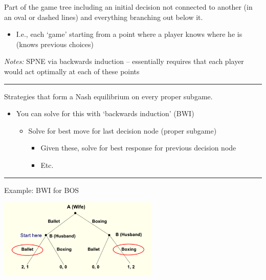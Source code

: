 \documentclass[]{article}
\providecommand{\tightlist}{%
  \setlength{\itemsep}{0pt}\setlength{\parskip}{0pt}}
\begin{document}
\begin{description}
\tightlist
\item[Proper subgame]
Part of the game tree including an initial decision not connected to
another (in an oval or dashed lines) and everything branching out below
it.
\end{description}

\begin{itemize}
\tightlist
\item
  I.e., each `game' starting from a point where a player knows where he
  is (knows previous choices)
\end{itemize}

\emph{Notes:} SPNE via backwards induction -- essentially requires that
each player would act optimally at each of these points

\begin{center}\rule{0.5\linewidth}{\linethickness}\end{center}

\begin{description}
\tightlist
\item[Subgame-Perfect Nash Equilibrium (SPNE)]
Strategies that form a Nash equilibrium on every proper subgame.
\end{description}

\begin{itemize}
\tightlist
\item
  You can solve for this with `backwards induction' (BWI)

  \begin{itemize}
  \tightlist
  \item
    Solve for best move for last decision node (proper subgame)

    \begin{itemize}
    \tightlist
    \item
      Given these, solve for best response for previous decision node
    \item
      Etc.
    \end{itemize}
  \end{itemize}
\end{itemize}

\begin{center}\rule{0.5\linewidth}{\linethickness}\end{center}

Example: BWI for BOS

\includegraphics[height=1.5in]{picsfigs/bosbwi1.png}
\end{document}
